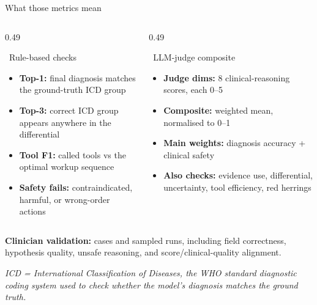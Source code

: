 \documentclass[aspectratio=169,t]{beamer}
\begin{document}
\begin{frame}{What those metrics mean}
  \vspace{-1mm}
  \begin{columns}[T,onlytextwidth]
    \begin{column}{0.49\textwidth}
      \begin{block}{\faBullseye\;\, Rule-based checks}
        \scriptsize
        \begin{itemize}\setlength\itemsep{0.08em}
          \item \textbf{Top-1:} final diagnosis matches the ground-truth ICD group
          \item \textbf{Top-3:} correct ICD group appears anywhere in the differential
          \item \textbf{Tool F1:} called tools vs the optimal workup sequence
          \item \textbf{Safety fails:} contraindicated, harmful, or wrong-order actions
        \end{itemize}
      \end{block}
    \end{column}%
    \hfill
    \begin{column}{0.49\textwidth}
      \begin{alertblock}{\faGavel\;\, LLM-judge composite}
        \scriptsize
        \begin{itemize}\setlength\itemsep{0.08em}
          \item \textbf{Judge dims:} 8 clinical-reasoning scores, each 0--5
          \item \textbf{Composite:} weighted mean, normalised to 0--1
          \item \textbf{Main weights:} diagnosis accuracy + clinical safety
          \item \textbf{Also checks:} evidence use, differential, uncertainty,
                tool efficiency, red herrings
        \end{itemize}
      \end{alertblock}
    \end{column}
  \end{columns}

  \vspace{0.4mm}
  \centering\scriptsize\color{CERNtextdark}
  {\color{CERNcyan}\faUserMd}\;\textbf{Clinician validation:}
  cases and sampled runs, including field correctness, hypothesis quality,
  unsafe reasoning, and score/clinical-quality alignment.

  \vspace{0.3mm}
  {\tiny\itshape\color{CERNtextdark}ICD = International Classification of
  Diseases, the WHO standard diagnostic coding system used to check whether
  the model's diagnosis matches the ground truth.}
\end{frame}
\end{document}
